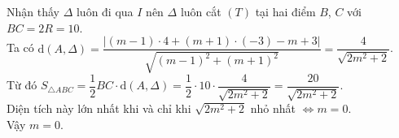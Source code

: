 \begin{bt}
{\begin{enumerate}
Nhận thấy $\Delta$ luôn đi qua $I$ nên $\Delta$ luôn cắt $(T)$ tại hai điểm $B$, $C$ với $BC=2R=10$.\\
Ta có $\mathrm{d}(A,\Delta) = \dfrac{|(m-1)\cdot 4 +(m+1)\cdot (-3) -m+3|}{\sqrt{(m-1)^2+(m+1)^2}} = \dfrac{4}{\sqrt{2m^2+2}}$.\\
Từ đó $S_{\triangle ABC} = \dfrac{1}{2} BC\cdot \mathrm{d}(A,\Delta) = \dfrac{1}{2} \cdot 10 \cdot \dfrac{4}{\sqrt{2m^2+2}} = \dfrac{20}{\sqrt{2m^2+2}}$.\\
Diện tích này lớn nhất khi và chỉ khi $\sqrt{2m^2+2}$ nhỏ nhất $\Leftrightarrow m=0$.\\
Vậy $m=0$.
\end{enumerate}
}
\end{bt}

